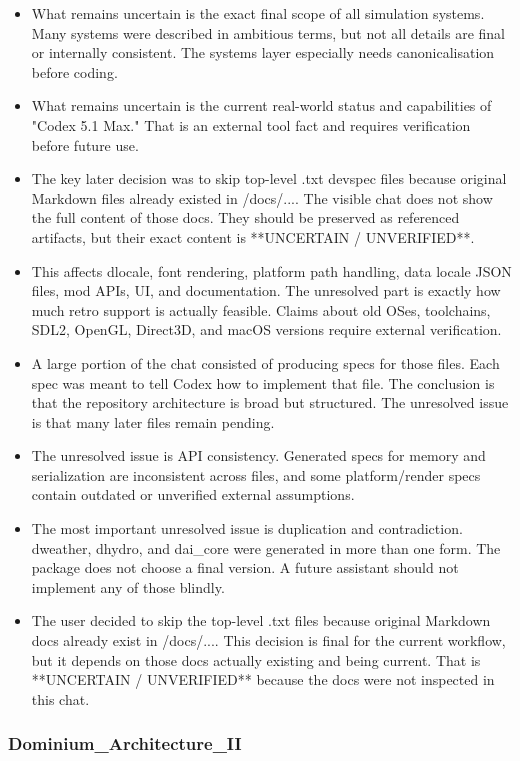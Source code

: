 \documentclass[11pt,a4paper]{report}
\begin{document}
\begin{itemize}
\item What remains uncertain is the exact final scope of all simulation systems. Many systems were described in ambitious terms, but not all details are final or internally consistent. The systems layer especially needs canonicalisation before coding.
\item What remains uncertain is the current real-world status and capabilities of "Codex 5.1 Max." That is an external tool fact and requires verification before future use.
\item The key later decision was to skip top-level .txt devspec files because original Markdown files already existed in /docs/.... The visible chat does not show the full content of those docs. They should be preserved as referenced artifacts, but their exact content is **UNCERTAIN / UNVERIFIED**.
\item This affects dlocale, font rendering, platform path handling, data locale JSON files, mod APIs, UI, and documentation. The unresolved part is exactly how much retro support is actually feasible. Claims about old OSes, toolchains, SDL2, OpenGL, Direct3D, and macOS versions require external verification.
\item A large portion of the chat consisted of producing specs for those files. Each spec was meant to tell Codex how to implement that file. The conclusion is that the repository architecture is broad but structured. The unresolved issue is that many later files remain pending.
\item The unresolved issue is API consistency. Generated specs for memory and serialization are inconsistent across files, and some platform/render specs contain outdated or unverified external assumptions.
\item The most important unresolved issue is duplication and contradiction. dweather, dhydro, and dai\_core were generated in more than one form. The package does not choose a final version. A future assistant should not implement any of those blindly.
\item The user decided to skip the top-level .txt files because original Markdown docs already exist in /docs/.... This decision is final for the current workflow, but it depends on those docs actually existing and being current. That is **UNCERTAIN / UNVERIFIED** because the docs were not inspected in this chat.
\end{itemize}

\subsubsection{Dominium\_Architecture\_II}
\end{document}
